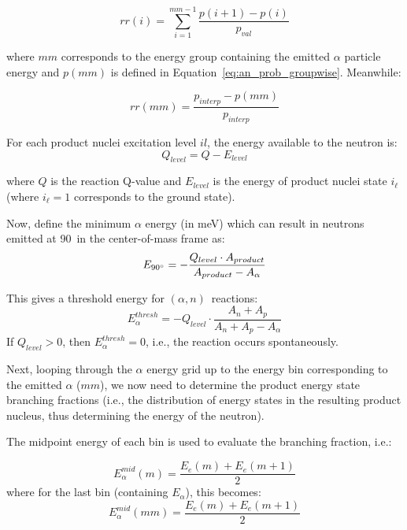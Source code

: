 \documentclass[10pt]{article}
\newcommand{\alphn}[0]{$\left(\alpha,n\right)$}
\begin{document}
\begin{equation}
rr\left(i\right) = \sum_{i=1}^{mm-1} \frac{ p\left(i+1\right) - p\left(i\right) }{p_{val}} 
\end{equation}

where $mm$ corresponds to the energy group containing the emitted $\alpha$ particle energy and $p\left(mm\right)$ is defined in Equation~\eqref{eq:an_prob_groupwise}. Meanwhile:

\begin{equation}
rr\left(mm\right)=\frac{p_{interp} - p\left( mm\right) }{p_{interp}}
\end{equation}

For each product nuclei excitation level $il$, the energy available to the neutron is:
\begin{equation}
Q_{level} = Q-E_{level}
\end{equation}

where $Q$ is the reaction Q-value and $E_{level}$ is the energy of product nuclei state $i_\ell$ (where $i_\ell=1$ corresponds to the ground state).

Now, define the minimum $\alpha$ energy (in meV) which can result in neutrons emitted at 90\degree\ in the center-of-mass frame as:
\begin{equation}
E_{90\degree} = -\frac{Q_{level} \cdot A_{product}}{A_{product}-A_\alpha} 
\end{equation}

This gives a threshold energy for \alphn\ reactions:
\begin{equation}
E_\alpha^{thresh} = - Q_{level} \cdot \frac{ A_n + A_p}{A_n + A_p - A_\alpha} 
\end{equation}
If $Q_{level} > 0$, then $E_\alpha^{thresh}=0$, i.e., the reaction occurs spontaneously.

Next, looping through the $\alpha$ energy grid up to the energy bin corresponding to the emitted $\alpha$ ($mm$), we now need to determine the product energy state branching fractions (i.e., the distribution of energy states in the resulting product nucleus, thus determining the energy of the neutron).

The midpoint energy of each bin is used to evaluate the branching fraction, i.e.:

\begin{equation}
E_\alpha^{mid}\left(m\right) = \frac{E_e\left(m\right) + E_e\left(m+1\right)}{2}
\end{equation}
where for the last bin (containing $E_\alpha$), this becomes:
\begin{equation}
E_\alpha^{mid}\left(mm\right) = \frac{E_e\left(m\right) + E_e\left(m+1\right)}{2}
\end{equation}
\end{document}
